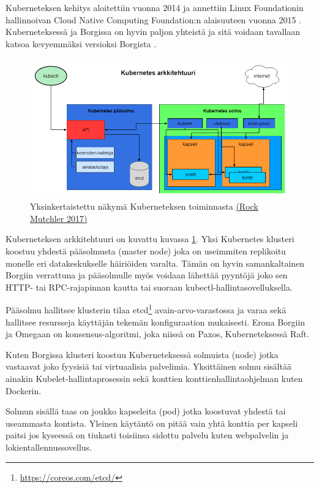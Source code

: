 \documentclass[finnish,gradu]{tktltiki3}
\begin{document}
    Kuberneteksen kehitys aloitettiin vuonna 2014 ja annettiin Linux Foundationin hallinnoivan Cloud Native Computing Foundation:n alaisuuteen vuonna 2015 \cite{tc-kubernetes-cncf}. Kuberneteksessä ja Borgissa on hyvin paljon yhteistä ja sitä voidaan tavallaan katsoa kevyemmäksi versioksi Borgista \cite{borg-goto-youtube}.
    
    \begin{figure}[h]
        \centering
        \includegraphics[width=1\textwidth]{images/kubernetes-2.png}
        \caption{Yksinkertaistettu näkymä Kuberneteksen toiminnasta \href{https://www.youtube.com/watch?v=YKg7uNMy_rc}{(Rock Mutchler 2017)}}
        \label{fig:kubernetes}
    \end{figure}
    
    Kuberneteksen arkkitehtuuri on kuvattu kuvassa \ref{fig:kubernetes}. Yksi Kubernetes klusteri koostuu yhdestä pääsolmusta (master node) joka on useimmiten replikoitu monelle eri datakeskukselle häiriöiden varalta. Tämän on hyvin samankaltainen Borgiin verrattuna ja pääsolmulle myös voidaan lähettää pyyntöjä joko sen HTTP- tai RPC-rajapinnan kautta tai suoraan kubectl-hallintasovelluksella.
    
    Pääsolmu hallitsee klusterin tilaa etcd\footnote{\url{https://coreos.com/etcd/}} avain-arvo-varastossa ja varaa sekä hallitsee resursseja käyttäjän tekemän konfiguraation mukaisesti. Erona Borgiin ja Omegaan on konsensus-algoritmi, joka niissä on Paxos, Kuberneteksessä Raft.
    
    Kuten Borgissa klusteri koostuu Kuberneteksessä solmuista (node) jotka vastaavat joko fyysisiä tai virtuaalisia palvelimia. Yksittäinen solmu sisältää ainakin Kubelet-hallintaprosessin sekä konttien konttienhallintaohjelman kuten Dockerin.
    
    Solmun sisällä taas on joukko kapseleita (pod) jotka koostuvat yhdestä tai useammasta kontista. Yleinen käytäntö on pitää vain yhtä konttia per kapseli paitsi jos kyseessä on tiukasti toisiinsa sidottu palvelu kuten webpalvelin ja lokientallennussovellus.
    
\end{document}
